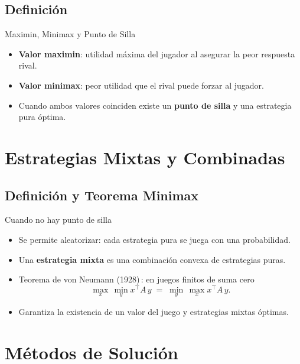 \documentclass{beamer}
\begin{document}
\subsection{Definición}
\begin{frame}{Maximin, Minimax y Punto de Silla}
\begin{itemize}[<+->]
  \item \textbf{Valor maximin}: utilidad máxima del jugador al asegurar la peor respuesta rival.
  \item \textbf{Valor minimax}: peor utilidad que el rival puede forzar al jugador.
  \item Cuando ambos valores coinciden existe un \textbf{punto de silla} y una estrategia pura óptima.
\end{itemize}
\end{frame}

\section{Estrategias Mixtas y Combinadas}

\subsection{Definición y Teorema Minimax}
\begin{frame}{Cuando no hay punto de silla}
\begin{itemize}[<+->]
  \item Se permite aleatorizar: cada estrategia pura se juega con una probabilidad.
  \item Una \textbf{estrategia mixta} es una combinación convexa de estrategias puras.
  \item Teorema de von Neumann (1928)\,: en juegos finitos de suma cero
        \[
          \max_{x}\,\min_{y} x^\top A\,y \;=\;
          \min_{y}\,\max_{x} x^\top A\,y.
        \]
  \item Garantiza la existencia de un valor del juego y estrategias mixtas óptimas.
\end{itemize}
\end{frame}

\section{Métodos de Solución}
\end{document}
